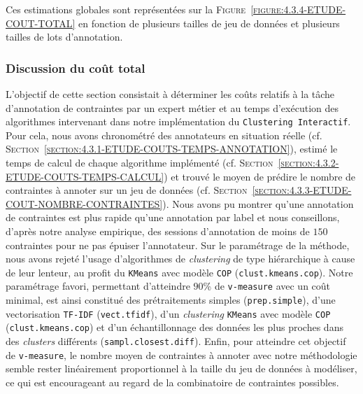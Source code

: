 			Ces estimations globales sont représentées sur la \textsc{Figure~\ref{figure:4.3.4-ETUDE-COUT-TOTAL}} en fonction de plusieurs tailles de jeu de données et plusieurs tailles de lots d'annotation.

		\subsubsection{Discussion du coût total}
		
			L'objectif de cette section consistait à déterminer les coûts relatifs à la tâche d'annotation de contraintes par un expert métier et au temps d'exécution des algorithmes intervenant dans notre implémentation du \texttt{Clustering Interactif}.
			Pour cela, nous avons chronométré des annotateurs en situation réelle (cf. \textsc{Section~\ref{section:4.3.1-ETUDE-COUTS-TEMPS-ANNOTATION}}), estimé le temps de calcul de chaque algorithme implémenté (cf. \textsc{Section~\ref{section:4.3.2-ETUDE-COUTS-TEMPS-CALCUL}}) et trouvé le moyen de prédire le nombre de contraintes à annoter sur un jeu de données (cf. \textsc{Section~\ref{section:4.3.3-ETUDE-COUT-NOMBRE-CONTRAINTES}}).
			Nous avons pu montrer qu'une annotation de contraintes est plus rapide qu'une annotation par label et nous conseillons, d'après notre analyse empirique, des sessions d'annotation de moins de $150$ contraintes pour ne pas épuiser l'annotateur.
			Sur le paramétrage de la méthode, nous avons rejeté l'usage d'algorithmes de \textit{clustering} de type hiérarchique à cause de leur lenteur, au profit du \texttt{KMeans} avec modèle \texttt{COP} (\texttt{clust.kmeans.cop}).
			Notre paramétrage favori, permettant d'atteindre $90$\% de \texttt{v-measure} avec un coût minimal, est ainsi constitué des prétraitements simples (\texttt{prep.simple}), d'une vectorisation \texttt{TF-IDF} (\texttt{vect.tfidf}), d'un \textit{clustering} \texttt{KMeans} avec modèle \texttt{COP} (\texttt{clust.kmeans.cop}) et d'un échantillonnage des données les plus proches dans des \textit{clusters} différents (\texttt{sampl.closest.diff}).
			Enfin, pour atteindre cet objectif de \texttt{v-measure}, le nombre moyen de contraintes à annoter avec notre méthodologie semble rester linéairement proportionnel à la taille du jeu de données à modéliser, ce qui est encourageant au regard de la combinatoire de contraintes possibles.
			\\
			
